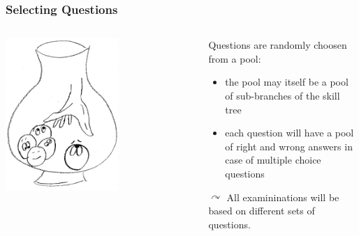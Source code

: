 \begin{frame}
 \frametitle{Selecting Questions}
 \begin{columns}
    \begin{column}{.5\textwidth}
       \centering
      \includegraphics[width=0.6\textwidth]{images/urn}
    \end{column}
    \begin{column}{.5\textwidth}
      Questions are randomly choosen from a pool:
      \begin{itemize}
        \item the pool may itself be a pool of sub-branches of the skill tree
        \item each question will have a pool of right and wrong answers in case of multiple choice questions
      \end{itemize}
      $\curvearrowright$ All examininations will be based on different sets of questions.
    \end{column}
  \end{columns}
\end{frame}

